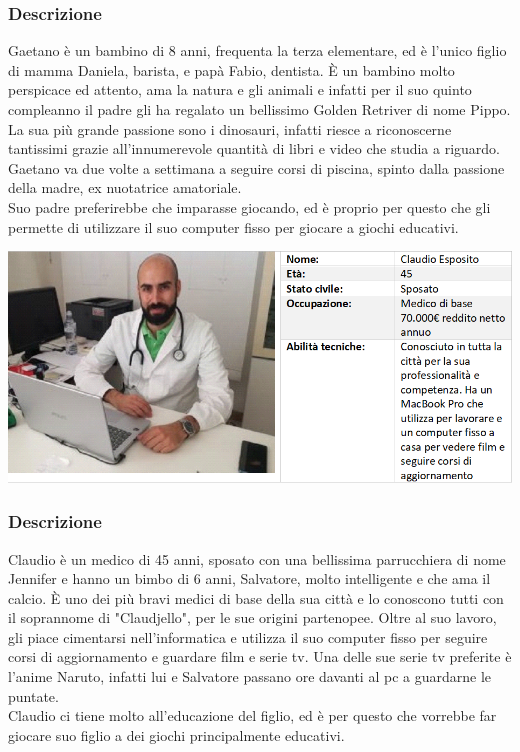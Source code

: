 \documentclass[../Report.tex]{subfiles}
\begin{document}
    \subsubsection{Descrizione}
    Gaetano è un bambino di 8 anni, frequenta la terza elementare, ed è l'unico figlio di mamma Daniela, barista, e papà Fabio, dentista. È un bambino molto perspicace ed attento, ama la natura e gli animali e infatti per il suo quinto compleanno il padre gli ha regalato un bellissimo Golden Retriver di nome Pippo. La sua più grande passione sono i dinosauri, infatti riesce a riconoscerne tantissimi grazie all'innumerevole quantità di libri e video che studia a riguardo.
    Gaetano va due volte a settimana a seguire corsi di piscina, spinto dalla passione della madre, ex nuotatrice amatoriale.\\
    Suo padre preferirebbe che imparasse giocando, ed è proprio per questo che gli permette di utilizzare il suo computer fisso per giocare a giochi educativi.

    \vspace{1.5cm}

    \begin{center}
        \includegraphics[width=0.9\linewidth]{Tab_Claudio.png}
    \end{center}

    \subsubsection{Descrizione}
    Claudio è un medico di 45 anni, sposato con una bellissima parrucchiera di nome Jennifer e hanno un bimbo di 6 anni, Salvatore, molto intelligente e che ama il calcio. È uno dei più bravi medici di base della sua città e lo conoscono tutti con il soprannome di "Claudjello", per le sue origini partenopee. Oltre al suo lavoro, gli piace cimentarsi nell'informatica e utilizza il suo computer fisso per seguire corsi di aggiornamento e guardare film e serie tv. Una delle sue serie tv preferite è l'anime Naruto, infatti lui e Salvatore passano ore davanti al pc a guardarne le puntate.\\
    Claudio ci tiene molto all'educazione del figlio, ed è per questo che vorrebbe far giocare suo figlio a dei giochi principalmente educativi.
\end{document}

